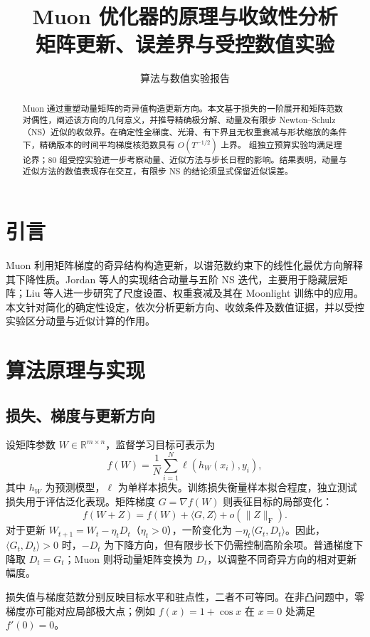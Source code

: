 \documentclass[11pt,a4paper]{article}
\title{Muon 优化器的原理与收敛性分析\\[5pt]\large 矩阵更新、误差界与受控数值实验}
\author{算法与数值实验报告}
\date{}
\theoremstyle{definition}
\newcommand{\F}{\mathrm{F}}
\begin{document}
\maketitle
\begin{abstract}
Muon 通过重塑动量矩阵的奇异值构造更新方向。本文基于损失的一阶展开和矩阵范数对偶性，阐述该方向的几何意义，并推导精确极分解、动量及有限步 Newton--Schulz（NS）近似的收敛界。在确定性全梯度、光滑、有下界且无权重衰减与形状缩放的条件下，精确版本的时间平均梯度核范数具有 $O(T^{-1/2})$ 上界。\NumRuns{} 组独立预算实验均满足理论界；80 组受控实验进一步考察动量、近似方法与步长日程的影响。结果表明，动量与近似方法的数值表现存在交互，有限步 NS 的结论须显式保留近似误差。
\end{abstract}

\section{引言}
Muon 利用矩阵梯度的奇异结构构造更新，以谱范数约束下的线性化最优方向解释其下降性质。Jordan 等人的实现\cite{jordan,code}结合动量与五阶 NS 迭代，主要用于隐藏层矩阵；Liu 等人\cite{liu}进一步研究了尺度设置、权重衰减及其在 Moonlight 训练中的应用。本文针对简化的确定性设定，依次分析更新方向、收敛条件及数值证据，并以受控实验区分动量与近似计算的作用。

\section{算法原理与实现}
\subsection{损失、梯度与更新方向}
设矩阵参数 $W\in\mathbb R^{m\times n}$，监督学习目标可表示为
\[
 f(W)=\frac1N\sum_{i=1}^{N}\ell(h_W(x_i),y_i),
\]
其中 $h_W$ 为预测模型，$\ell$ 为单样本损失。训练损失衡量样本拟合程度，独立测试损失用于评估泛化表现。矩阵梯度 $G=\nabla f(W)$ 则表征目标的局部变化：
\begin{equation}
 f(W+Z)=f(W)+\langle G,Z\rangle+o(\|Z\|_\F).
 \label{eq:firstorder}
\end{equation}
对于更新 $W_{t+1}=W_t-\eta_tD_t$（$\eta_t>0$），一阶变化为 $-\eta_t\langle G_t,D_t\rangle$。因此，$\langle G_t,D_t\rangle>0$ 时，$-D_t$ 为下降方向，但有限步长下仍需控制高阶余项。普通梯度下降取 $D_t=G_t$；Muon 则将动量矩阵变换为 $D_t$，以调整不同奇异方向的相对更新幅度。

损失值与梯度范数分别反映目标水平和驻点性，二者不可等同。在非凸问题中，零梯度亦可能对应局部极大点；例如 $f(x)=1+\cos x$ 在 $x=0$ 处满足 $f'(0)=0$。
\end{document}
